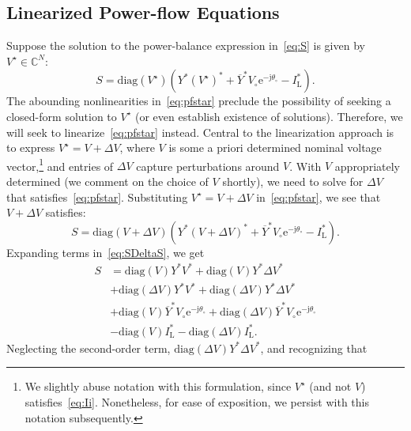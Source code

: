 \documentclass[10 pt, conference]{ieeeconf}
\begin{document}
\subsection{Linearized Power-flow Equations} \label{sec:PowerFlow}
Suppose the solution to the power-balance expression in~\eqref{eq:S} is given by $V^\star \in \mathbb{C}^N$:
\begin{equation}
S = \mathrm{diag}(V^\star) \left(Y^* (V^\star)^* + \overline{Y}^* V_\circ \mathrm{e}^{-\mathrm j \theta_\circ}- I_\mathrm{L}^*\right).
\label{eq:pfstar}
\end{equation}
The abounding nonlinearities in~\eqref{eq:pfstar} preclude the possibility of seeking a closed-form solution to $V^\star$ (or even establish existence of solutions). Therefore, we will seek to linearize~\eqref{eq:pfstar} instead. Central to the linearization approach is to express $V^\star = V + \Delta V$, where $V$ is some a priori determined nominal voltage vector,\footnote{We slightly abuse notation with this formulation, since $V^\star$ (and not $V$) satisfies~\eqref{eq:Ii}. Nonetheless, for ease of exposition, we persist with this notation subsequently.} and entries of $\Delta V$ capture perturbations around $V$.  With $V$ appropriately determined (we comment on the choice of $V$ shortly), we need to solve for $\Delta V$ that satisfies~\eqref{eq:pfstar}.  Substituting $V^\star = V + \Delta V$ in~\eqref{eq:pfstar}, we see that $V+ \Delta V$ satisfies:
\begin{equation} \label{eq:SDeltaS}
S = \mathrm{diag}\left(V + \Delta V\right) \left( Y^* (V + \Delta V)^* + \overline{Y}^* V_\circ \mathrm{e}^{-\mathrm j \theta_\circ}- I_\mathrm{L}^*\right).
\end{equation}
Expanding terms in~\eqref{eq:SDeltaS}, we get 
\begin{align} \label{eq:Sinter}
S &= \mathrm{diag}\left(V\right) Y^* V^* + \mathrm{diag}\left(V\right) Y^* \Delta V^*  \nonumber \\
  &+ \mathrm{diag}\left(\Delta V\right) Y^* V^*  + \mathrm{diag}\left(\Delta V\right) Y^* \Delta V^* \nonumber \\
  &+ \mathrm{diag}\left( V\right)  \overline{Y}^* V_\circ \mathrm{e}^{-\mathrm j \theta_\circ} + \mathrm{diag}\left( \Delta V\right)  \overline{Y}^* V_\circ \mathrm{e}^{-\mathrm j \theta_\circ} \nonumber \\
  &- \mathrm{diag}\left(V\right) I_\mathrm{L}^* - \mathrm{diag}\left(\Delta V\right) I_\mathrm{L}^*.
\end{align}
Neglecting the second-order term, $\mathrm{diag}\left(\Delta V\right) Y^* \Delta V^*$, and recognizing that
\end{document}

